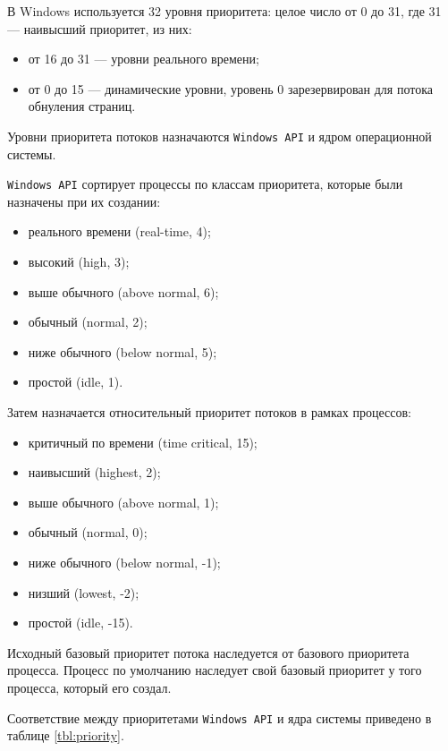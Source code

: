 \documentclass[a4paper,12pt]{bmstu}
\begin{document}
В Windows используется 32 уровня приоритета: целое число от 0 до 31, где 31 --- наивысший приоритет, из них:
\begin{itemize}
    \item от 16 до 31 --- уровни реального времени;
    \item от 0 до 15 --- динамические уровни, уровень 0 зарезервирован для потока обнуления страниц.
\end{itemize}

Уровни приоритета потоков назначаются \texttt{Windows API} и ядром операционной системы.

\texttt{Windows API} сортирует процессы по классам приоритета, которые были назначены при их создании:
\begin{itemize}
    \item реального времени (real-time, 4);
    \item высокий (high, 3);
    \item выше обычного (above normal, 6);
    \item обычный (normal, 2);
    \item ниже обычного (below normal, 5);
    \item простой (idle, 1).
\end{itemize}

Затем назначается относительный приоритет потоков в рамках процессов:

\begin{itemize}
    \item критичный по времени (time critical, 15);
    \item наивысший (highest, 2);
    \item выше обычного (above normal, 1);
    \item обычный (normal, 0);
    \item ниже обычного (below normal, -1);
    \item низший (lowest, -2);
    \item простой (idle, -15).
\end{itemize}

Исходный базовый приоритет потока наследуется от базового приоритета процесса. Процесс по умолчанию наследует свой базовый приоритет у того процесса, который его создал.

Соответствие между приоритетами \texttt{Windows API} и ядра системы приведено в таблице \ref{tbl:priority}.
\clearpage
\end{document}
